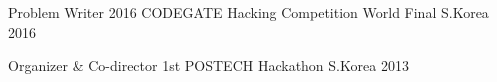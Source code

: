 
\begin{cvhonors}

  \cvhonor
  {Problem Writer} %
  {2016 CODEGATE Hacking Competition World Final} %
  {S.Korea} %
  {2016} %

  \cvhonor
  {Organizer \& Co-director} %
  {1st POSTECH Hackathon} %
  {S.Korea} %
  {2013} %

\end{cvhonors}

